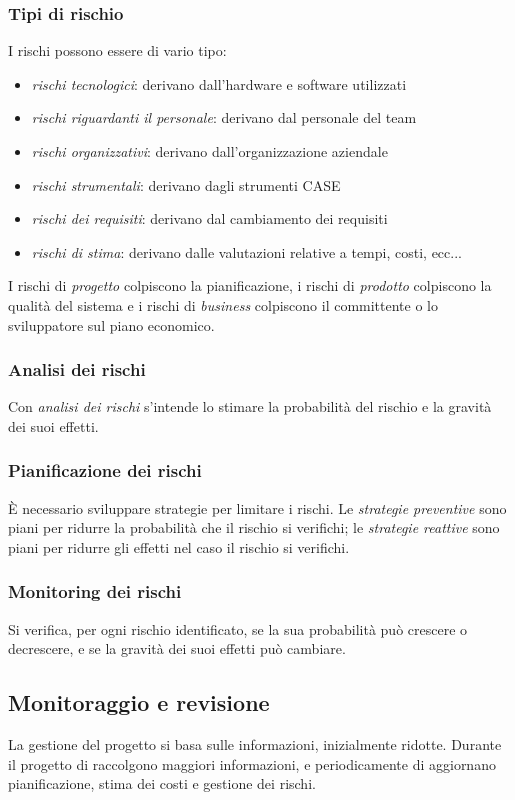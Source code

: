 \documentclass[11pt]{article}
\begin{document}
\subsubsection*{Tipi di rischio}
I rischi possono essere di vario tipo:
\begin{itemize}
    \item \textit{rischi tecnologici}: derivano dall'hardware e software utilizzati
    \item \textit{rischi riguardanti il personale}: derivano dal personale del team
    \item \textit{rischi organizzativi}: derivano dall'organizzazione aziendale
    \item \textit{rischi strumentali}: derivano dagli strumenti CASE
    \item \textit{rischi dei requisiti}: derivano dal cambiamento dei requisiti
    \item \textit{rischi di stima}: derivano dalle valutazioni relative a tempi, costi, ecc... 
\end{itemize}
I rischi di \textit{progetto} colpiscono la pianificazione, i rischi di \textit{prodotto} colpiscono la qualità del sistema 
e i rischi di \textit{business} colpiscono il committente o lo sviluppatore sul piano economico.
\subsubsection*{Analisi dei rischi}
Con \textit{analisi dei rischi} s'intende lo stimare la probabilità del rischio e la gravità dei suoi effetti.
\subsubsection*{Pianificazione dei rischi}
È necessario sviluppare strategie per limitare i rischi. Le \textit{strategie preventive} sono piani per ridurre la 
probabilità che il rischio si verifichi; le \textit{strategie reattive} sono piani per ridurre gli effetti nel caso il 
rischio si verifichi.
\subsubsection*{Monitoring dei rischi}
Si verifica, per ogni rischio identificato, se la sua probabilità può crescere o decrescere, e se la gravità dei suoi 
effetti può cambiare.
\subsection{Monitoraggio e revisione}
La gestione del progetto si basa sulle informazioni, inizialmente ridotte. Durante il progetto di raccolgono maggiori 
informazioni, e periodicamente di aggiornano pianificazione, stima dei costi e gestione dei rischi.
\end{document}
